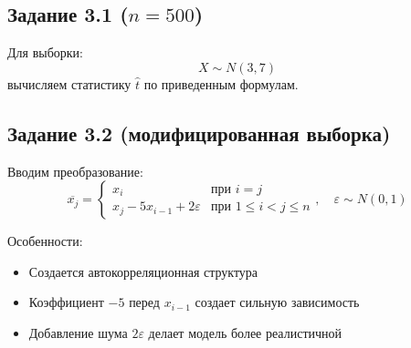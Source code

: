 \documentclass{article}
\begin{document}
\subsection{Задание 3.1 ($n=500$)}
Для выборки:
\[ X \sim N(3, 7) \]
вычисляем статистику $\hat{t}$ по приведенным формулам.

\subsection{Задание 3.2 (модифицированная выборка)}
Вводим преобразование:
\[
\overline{x_j} = \begin{cases}
x_i & \text{при } i = j \\
x_j - 5x_{i-1} + 2\varepsilon & \text{при } 1 \leq i < j \leq n
\end{cases}, \quad \varepsilon \sim N(0,1)
\]

Особенности:
\begin{itemize}
    \item Создается автокорреляционная структура
    \item Коэффициент $-5$ перед $x_{i-1}$ создает сильную зависимость
    \item Добавление шума $2\varepsilon$ делает модель более реалистичной
\end{itemize}
\end{document}
